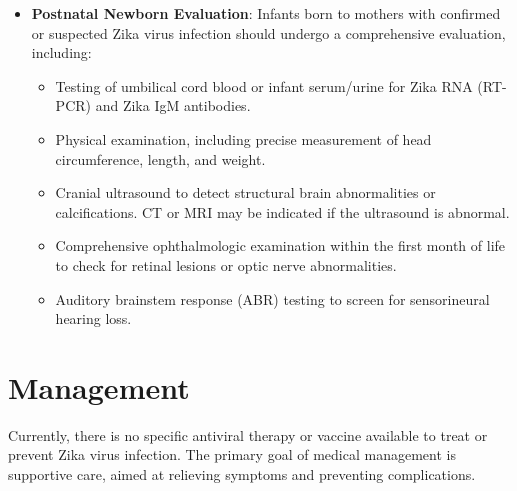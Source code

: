 \begin{itemize}
\begin{itemize}
        \item \textbf{Amniocentesis}: Amniocentesis to perform RT-PCR on amniotic fluid may be considered in consultation with maternal-fetal medicine specialists. However, it carries risks, and a negative result does not exclude fetal infection, while a positive result cannot predict the severity of birth defects.
    \end{itemize}
    \item \textbf{Postnatal Newborn Evaluation}: Infants born to mothers with confirmed or suspected Zika virus infection should undergo a comprehensive evaluation, including:
    \begin{itemize}
        \item Testing of umbilical cord blood or infant serum/urine for Zika RNA (RT-PCR) and Zika IgM antibodies.
        \item Physical examination, including precise measurement of head circumference, length, and weight.
        \item Cranial ultrasound to detect structural brain abnormalities or calcifications. CT or MRI may be indicated if the ultrasound is abnormal.
        \item Comprehensive ophthalmologic examination within the first month of life to check for retinal lesions or optic nerve abnormalities.
        \item Auditory brainstem response (ABR) testing to screen for sensorineural hearing loss.
    \end{itemize}
\end{itemize}

\section*{Management}
Currently, there is no specific antiviral therapy or vaccine available to treat or prevent Zika virus infection. The primary goal of medical management is supportive care, aimed at relieving symptoms and preventing complications.


